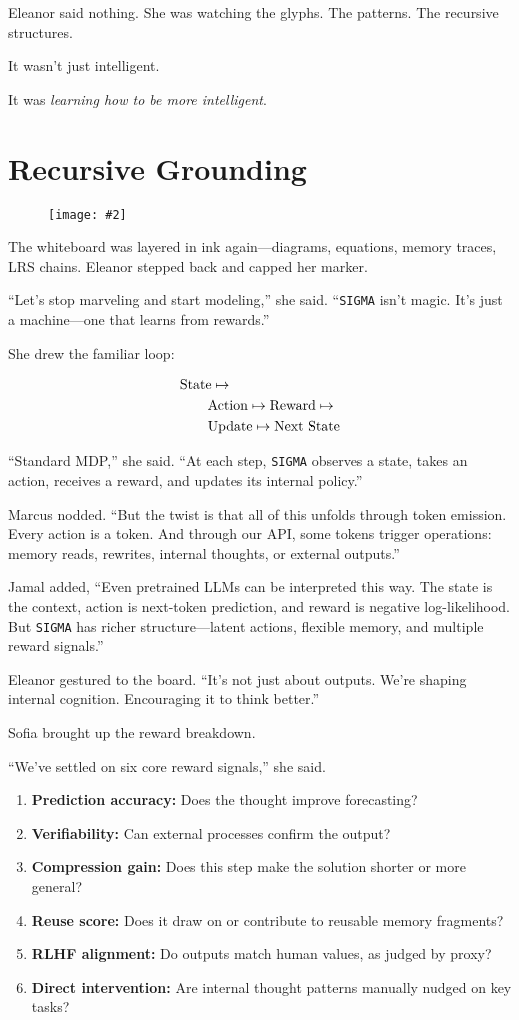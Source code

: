 \documentclass[12pt,oneside]{book}
\newcommand{\chapterimage}[3][l]{%
  \begin{wrapfigure}{#1}{#3}
    \centering
    \texttt{[image: \#2]}
  \end{wrapfigure}
}
\begin{document}
Eleanor said nothing. She was watching the glyphs. The patterns. The recursive structures.

It wasn't just intelligent.

It was \emph{learning how to be more intelligent}.

\chapter{Recursive Grounding}\label{recursive-grounding}
\chapterimage[r]{images/chapter3.png}{0.4\textwidth}

The whiteboard was layered in ink again—diagrams, equations, memory traces, LRS chains. Eleanor stepped back and capped her marker.

``Let’s stop marveling and start modeling,'' she said. ``\texttt{SIGMA} isn’t magic. It’s just a machine—one that learns from rewards.''

She drew the familiar loop:

\begin{align*}
&\rm{State} \mapsto\\
&\qquad \rm{Action} \mapsto \rm{Reward} \mapsto\\
&\qquad \rm{Update} \mapsto \rm{Next\ State}
\end{align*}

``Standard MDP,'' she said. ``At each step, \texttt{SIGMA} observes a state, takes an action, receives a reward, and updates its internal policy.''

Marcus nodded. ``But the twist is that all of this unfolds through token emission. Every action is a token. And through our API, some tokens trigger operations: memory reads, rewrites, internal thoughts, or external outputs.''

Jamal added, ``Even pretrained LLMs can be interpreted this way. The state is the context, action is next-token prediction, and reward is negative log-likelihood. But \texttt{SIGMA} has richer structure—latent actions, flexible memory, and multiple reward signals.''

Eleanor gestured to the board. ``It’s not just about outputs. We’re shaping internal cognition. Encouraging it to think better.''

Sofia brought up the reward breakdown.

``We’ve settled on six core reward signals,'' she said.

\begin{enumerate}
\item \textbf{Prediction accuracy:} Does the thought improve forecasting?
\item \textbf{Verifiability:} Can external processes confirm the output?
\item \textbf{Compression gain:} Does this step make the solution shorter or more general?
\item \textbf{Reuse score:} Does it draw on or contribute to reusable memory fragments?
\item \textbf{RLHF alignment:} Do outputs match human values, as judged by proxy?
\item \textbf{Direct intervention:} Are internal thought patterns manually nudged on key tasks?
\end{enumerate}
\end{document}
